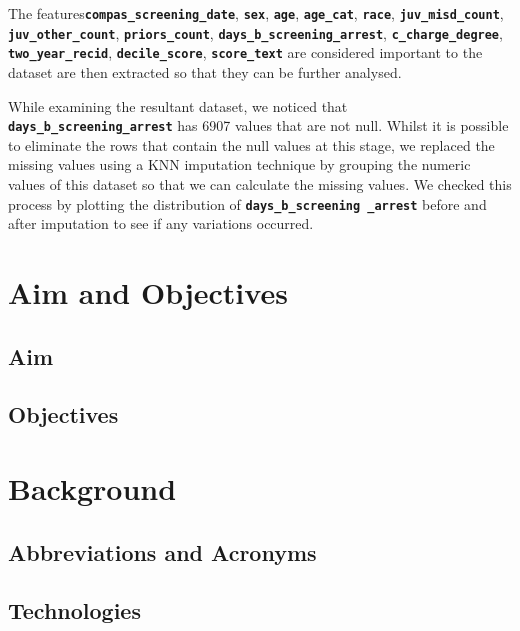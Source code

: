 \documentclass[conference]{IEEEtran}
\begin{document}
	\begin{flushleft}
	The features\textbf{\texttt{compas\_screening\_date}}, \textbf{\texttt{sex}}, \textbf{\texttt{age}}, \textbf{\texttt{age\_cat}}, \textbf{\texttt{race}}, \textbf{\texttt{juv\_misd\_count}}, \textbf{\texttt{juv\_other\_count}}, \textbf{\texttt{priors\_count}}, \textbf{\texttt{days\_b\_screening\_arrest}}, \textbf{\texttt{c\_charge\_degree}}, \textbf{\texttt{two\_year\_recid}}, \textbf{\texttt{decile\_score}}, \textbf{\texttt{score\_text}} are considered important to the dataset are then extracted so that they can be further analysed. 
	\end{flushleft}
	
	While examining the resultant dataset, we noticed that \textbf{\texttt{days\_b\_screening\_arrest}}  has  6907 values that are not null. Whilst it is possible to eliminate the rows that contain the null values at this stage, we replaced the missing values using a KNN imputation technique by grouping the numeric values of this dataset so that we can calculate the missing values. We checked this process by plotting the distribution of \textbf{\texttt{days\_b\_screening \_arrest}}  before and after imputation to see if any variations occurred.
	
	
	\section{Aim and Objectives}
	
	

	
	\subsection{Aim}
	
	\subsection{Objectives}
	

	
	
	\section{Background}
	
	\subsection{Abbreviations and Acronyms}\label{AA}
	
	\subsection{Technologies}
	
\end{document}
